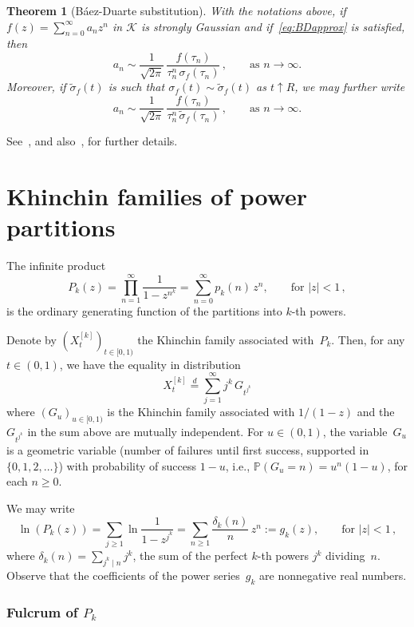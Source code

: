 \documentclass[12pt]{amsart}
\newtheorem{theoremL}{Theorem}
\theoremstyle{definition}
\begin{document}
\begin{theoremL}[B\'aez-Duarte substitution]\label{thm:baezduarte}
With the notations above, if $f(z)=\sum_{n=0}^{\infty} a_n z^n$
in $\mathcal{K}$ is strongly Gaussian and if~\eqref{eq:BDapprox} is satisfied, then
\[
a_n \sim \frac{1}{\sqrt{2\pi}}\, \frac{f(\tau_n)}{\tau_n^n\, \sigma_f(\tau_n)}\,, \qquad \text{as } n\to\infty.
\]
Moreover, if $\tilde{\sigma}_f(t)$ is such that $\sigma_f(t)\sim\tilde{\sigma}_f(t)$ as $t\uparrow R$, we may further write
\begin{equation}\label{eq:BDfinal}
a_n \sim \frac{1}{\sqrt{2\pi}}\, \frac{f(\tau_n)}{\tau_n^n\, \tilde{\sigma}_f(\tau_n)}\,, \qquad \text{as } n\to\infty.
\end{equation}
\end{theoremL}

See~\cite{BaezDuarte}, and also~\cite{CFMK}, for further details.


\section{Khinchin families of power partitions}\label{sec:partitions}

The infinite product
\[
P_k(z) = \prod_{n=1}^{\infty} \frac{1}{1-z^{n^k}} = \sum_{n=0}^{\infty} p_k(n)\, z^n, \qquad \text{for } |z|<1\,,
\]
is the ordinary generating function of the partitions into $k$-th powers.

Denote by $(X^{[k]}_t)_{t\in[0,1)}$ the Khinchin family associated with~$P_k$. Then, for any $t\in(0,1)$,
we have the equality in distribution
\[
X^{[k]}_t \stackrel{d}{=} \sum_{j=1}^{\infty} j^k\, G_{t^{j^k}}
\]
where $(G_u)_{u\in[0,1)}$ is the Khinchin family associated with $1/(1-z)$ and the $G_{t^{j^k}}$ in the sum
above are mutually independent. For $u\in(0,1)$, the variable~$G_u$ is a geometric variable
(number of failures until first success, supported in $\{0,1,2,\ldots\}$) with probability of
success $1-u$, i.e., $\mathbb{P}(G_u=n) = u^n(1-u)$, for each $n\ge 0$.

We may write
\[
\ln(P_k(z)) = \sum_{j\ge 1} \ln\frac{1}{1-z^{j^k}} = \sum_{n\ge 1} \frac{\delta_k(n)}{n}\, z^n := g_k(z), \qquad \text{for } |z|<1\,,
\]
where $\delta_k(n) = \sum_{j^k\mid n} j^k$, the sum of the perfect $k$-th powers $j^k$ dividing~$n$. Observe that
the coefficients of the power series~$g_k$ are nonnegative real numbers.


\subsubsection{Fulcrum of $P_k$}\label{subsubsec:fulcrumPk}
\end{document}
